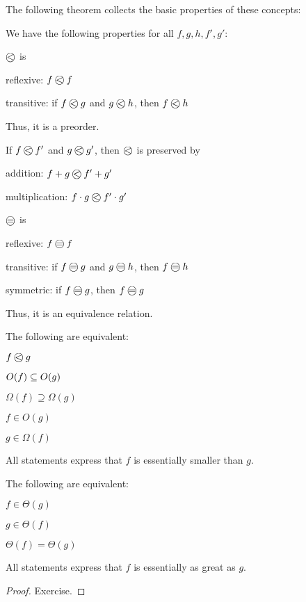 The following theorem collects the basic properties of these concepts:

\begin{theorem}[O-Notation]\label{thm:ad:onot}
We have the following properties for all $f,g,h,f',g'$:
\begin{compactitem}
 \item $\Oleq{}{}$ is
	\begin{compactitem}
	 \item reflexive: $\Oleq{f}{f}$
	 \item transitive: if $\Oleq{f}{g}$ and $\Oleq{g}{h}$, then $\Oleq{f}{h}$
	\end{compactitem}
  Thus, it is a preorder.
 \item If $\Oleq{f}{f'}$ and $\Oleq{g}{g'}$, then $\Oleq{}{}$ is preserved by
	\begin{compactitem}
	 \item addition: $\Oleq{f+g}{f'+g'}$
	 \item multiplication: $\Oleq{f\cdot g}{f'\cdot g'}$
	\end{compactitem}
 \item $\Oeq{}{}$ is
	\begin{compactitem}
	 \item reflexive: $\Oeq{f}{f}$
	 \item transitive: if $\Oeq{f}{g}$ and $\Oeq{g}{h}$, then $\Oeq{f}{h}$
	 \item symmetric: if $\Oeq{f}{g}$, then $\Oeq{f}{g}$
	\end{compactitem}
  Thus, it is an equivalence relation.
 \item The following are equivalent:
 	\begin{compactitem}
 	 \item $\Oleq{f}{g}$
 	 \item $O(f)\subseteq O(g)$
 	 \item $\Omega(f)\supseteq \Omega(g)$
 	 \item $f\in O(g)$
 	 \item $g\in \Omega(f)$
 	\end{compactitem}
  All statements express that $f$ is essentially smaller than $g$.
 \item The following are equivalent:
 	\begin{compactitem}
 	 \item $f\in\Theta(g)$
 	 \item $g\in\Theta(f)$
 	 \item $\Theta(f)=\Theta(g)$
 	\end{compactitem}
  All statements express that $f$ is essentially as great as $g$.  
\end{compactitem}
\end{theorem}
\begin{proof}
Exercise.
\end{proof}

